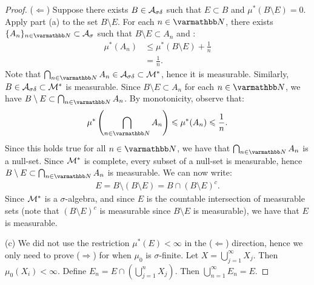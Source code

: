 \begin{proof}
        ($\Leftarrow$) Suppose there exists $B \in \mathcal{A}_{\sigma \delta}$ such that $E \subset B$ and $\mu^\ast(B \setminus E) = 0$. Apply part (a) to the set $B \setminus E$. For each $n \in \bfN$, there exists $\{A_n\}_{n \in \bfN} \subset \cA_\sigma$ such that $B \setminus E \subset A_n$ and :
            \begin{equation*}
            \begin{split}
                \mu^\ast(A_n) 
                & \leq \mu^\ast(B \setminus E) + \frac{1}{n} \\
                & = \frac{1}{n}.
            \end{split}
            \end{equation*}
        Note that $\bigcap_{n \in \bfN}A_n \in \cA_{\sigma\delta} \subset \cM^\ast$, hence it is measurable. Similarly, $B \in \mathcal{A}_{\sigma\delta} \subset \mathcal{M}^\ast$ is measurable. Since $B \setminus E \subset A_n$ for each $n \in \bfN$, we have $B \setminus E \subset \bigcap_{n \in \bfN}A_n$. By monotonicity, observe that:
            \begin{equation*}
            \begin{split}
                \mu^\ast \left( \bigcap_{n \in \bfN}A_n \right) \leq \mu^\ast(A_n) \leq \frac{1}{n}.
            \end{split}
            \end{equation*}
        Since this holds true for all $n \in \bfN$, we have that $\bigcap_{n \in \bfN}A_n$ is a null-set. Since $\mathcal{M}^\ast$ is complete, every subset of a null-set is measurable, hence $B \setminus E \subset \bigcap_{n \in \bfN}A_n$ is measurable. We can now write:
            \begin{equation*}
            \begin{split}
                E = B \setminus (B \setminus E) = B \cap (B \setminus E)^c.
            \end{split}
            \end{equation*}
        Since $\mathcal{M}^\ast$ is a $\sigma$-algebra, and since $E$ is the countable intersection of measurable sets (note that $(B\setminus E)^c$ is measurable since $B\setminus E$ is measurable), we have that $E$ is measurable.

        (c) We did not use the restriction $\mu^\ast (E) < \infty$ in the ($\Leftarrow$) direction, hence we only need to prove ($\Rightarrow$) for when $\mu_0$ is $\sigma$-finite. Let $X = \bigcup_{j = 1}^\infty X_j$. Then $\mu_0(X_i) < \infty$. Define $E_n = E \cap \left( \bigcup_{j = 1}^n X_j \right)$. Then $\bigcup_{n = 1}^\infty E_n = E$. \nl
        

\end{proof}
